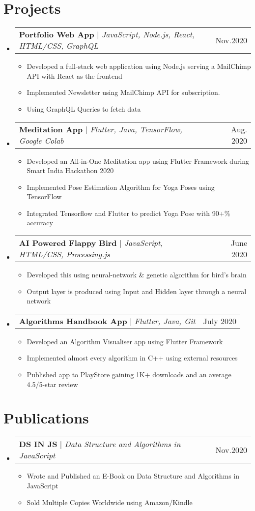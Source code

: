 \documentclass[letterpaper,11pt]{article}
\makeatletter
\newcommand{\resumeItem}[1]{
  \item\small{
    {#1 \vspace{-2pt}}
  }
}
\newcommand{\resumeProjectHeading}[2]{
    \item
    \begin{tabular*}{0.97\textwidth}{l@{\extracolsep{\fill}}r}
      \small#1 & #2 \\
    \end{tabular*}\vspace{-7pt}
}
\newcommand{\resumeSubHeadingListStart}{\begin{itemize}[leftmargin=0.15in, label={}]}
\newcommand{\resumeSubHeadingListEnd}{\end{itemize}}
\newcommand{\resumeItemListStart}{\begin{itemize}}
\newcommand{\resumeItemListEnd}{\end{itemize}\vspace{-5pt}}
\makeatother
\begin{document}
\section{Projects}
    \resumeSubHeadingListStart
      \resumeProjectHeading
          {\textbf{Portfolio Web App} $|$ \emph{JavaScript, Node.js, React, HTML/CSS, GraphQL}}{Nov.2020}
          \resumeItemListStart
            \resumeItem{Developed a full-stack web application using Node.js serving a MailChimp API with React as the frontend}
            \resumeItem{Implemented Newsletter using MailChimp API for subscription.}
            \resumeItem{Using GraphQL Queries to fetch data}
          \resumeItemListEnd
     \resumeProjectHeading
          {\textbf{Meditation App} $|$ \emph{Flutter, Java, TensorFlow, Google Colab}}{Aug. 2020}
          \resumeItemListStart
            \resumeItem{Developed an All-in-One Meditation app using Flutter Framework during Smart India Hackathon 2020}
            \resumeItem{Implemented Pose Estimation Algorithm for Yoga Poses using TensorFlow}
            \resumeItem{Integrated Tensorflow and Flutter to predict Yoga Pose with 90+\% accuracy}
          \resumeItemListEnd
     \resumeProjectHeading
          {\textbf{AI Powered Flappy Bird} $|$ \emph{JavaScript, HTML/CSS, Processing.js}}{June 2020}
          \resumeItemListStart
            \resumeItem{Developed this using neural-network \& genetic algorithm for bird's brain}
            \resumeItem{Output layer is produced using Input and Hidden layer through a neural network}
          \resumeItemListEnd
      \resumeProjectHeading
          {\textbf{Algorithms Handbook App} $|$ \emph{Flutter, Java, Git}}{July 2020}
          \resumeItemListStart
            \resumeItem{Developed an Algorithm Visualiser app using Flutter Framework}
            \resumeItem{Implemented almost every algorithm in C++ using external resources }
            \resumeItem{Published app to PlayStore gaining 1K+ downloads and an average 4.5/5-star review}
          \resumeItemListEnd

    \resumeSubHeadingListEnd

\section{Publications}
    \resumeSubHeadingListStart
      \resumeProjectHeading
          {\textbf{DS IN JS} $|$ \emph{Data Structure and Algorithms in JavaScript}}{Nov.2020}
          \resumeItemListStart
            \resumeItem{Wrote and Published an E-Book on Data Structure and Algorithms in JavaScript}
            \resumeItem{Sold Multiple Copies Worldwide using Amazon/Kindle}
          \resumeItemListEnd
            \resumeSubHeadingListEnd
\end{document}
